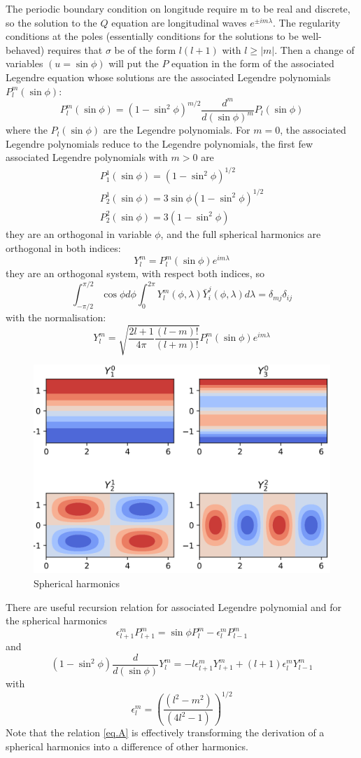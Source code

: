 The periodic boundary condition on longitude require m to be real and discrete, so the solution to the $Q$ equation are longitudinal waves $e^{\pm im\lambda}$. The regularity conditions at the poles (essentially conditions for the solutions to be well-behaved) requires that $\sigma$ be of the form $l(l+1)$ with $l\geq|m|$. Then a change of variables $(u=\sin\phi)$ will put the $P$ equation in the form of the associated Legendre equation whose solutions are the associated Legendre polynomials $P_l^m(\sin\phi)$:
\begin{equation}\label{eq.Legendre polyn}
	P_l^m(\sin\phi)=(1-\sin^2\phi)^{m/2}\frac{d^m}{d(\sin\phi)^m}P_l(\sin\phi)
\end{equation}
where the $P_l(\sin\phi)$ are the Legendre polynomials. For $m=0$, the associated Legendre polynomials reduce to the
Legendre polynomials, the first few associated Legendre
polynomials with $m>0$ are
\begin{align*}
	P_1^1(\sin\phi)=(1-\sin^2\phi)^{1/2}          \\
	P_2^1(\sin\phi)=3\sin\phi(1-\sin^2\phi)^{1/2} \\
	P_2^2(\sin\phi)=3(1-\sin^2\phi)
\end{align*}
they are an orthogonal in variable $\phi$, and the full spherical harmonics are orthogonal in both indices:
\begin{equation}
	Y_l^m=P_l^m(\sin\phi)e^{im\lambda}
\end{equation}
they are an orthogonal system, with respect both indices, so
\begin{equation}
	\int_{-\pi/2}^{\pi/2}\cos\phi d\phi\int_0^{2\pi}Y_l^m(\phi,\lambda)\bar{Y}_i^j(\phi,\lambda)d\lambda=\delta_{mj}\delta_{ij}
\end{equation}
with the normalisation:
$$Y_l^m=\sqrt{\frac{2l+1}{4\pi}\frac{(l-m)!}{(l+m)!}}P_l^m(\sin\phi)e^{im\lambda}$$
\begin{figure}[h]
	\centering
	\includegraphics[width=0.5\linewidth]{uploads/Screenshot 2024-11-17 201945.png}
	\caption{Spherical harmonics}
	\label{fig:spherical harmonics}
\end{figure}
There are useful recursion relation for associated Legendre
polynomial and for the spherical harmonics
$$\epsilon_{l+1}^mP_{l+1}^m=\sin\phi P^m_l-\epsilon_l^mP^m_{l-1}$$
and
\begin{equation}\label{eq.A}
	(1-\sin^2\phi)\frac{d}{d(\sin\phi)}Y_l^m=-l\epsilon_{l+1}^mY_{l+1}^m+(l+1)\epsilon_l^mY_{l-1}^m
\end{equation}
with
$$\epsilon_l^m=\left(\frac{(l^2-m^2)}{(4l^2-1)}\right)^{1/2}$$
Note that the relation \ref{eq.A} is effectively transforming the derivation of a spherical harmonics into a difference of other harmonics.



